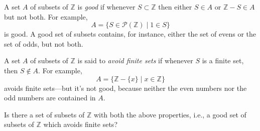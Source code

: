 \documentclass[12pt]{pset}
\newcommand{\Z}{\mathbb{Z}}
\begin{document}
\begin{problem}[Subsets]

  A set $A$ of subsets of $\Z$ is \textit{good} if whenever
  $S \subset \Z$ then either $S \in A$ or $\Z - S \in A$ but not both.  For example,
  \[
  A = \{ S \in \mathcal{P}(\Z) \mid 1 \in S \}
  \]
  is good.  A good set of subsets contains, for instance, either the
  set of evens or the set of odds, but not both.

  A set $A$ of subsets of $\Z$ is said to \textit{avoid finite sets} if
  whenever $S$ is a finite set, then $S \not\in A$.  For example, 
  \[
  A = \{ \Z - \{ x \} \mid x \in \Z \}
  \]
  avoids finite sets---but it's not good, because neither the even
  numbers nor the odd numbers are contained in $A$.

  Is there a set of subsets of $\Z$ with both the above properties, i.e.,
  a good set of subsets of $\Z$ which avoids finite sets?
 

\end{problem}
\end{document}

